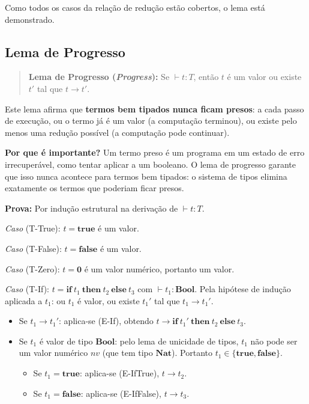 Como todos os casos da relação de redução estão cobertos, o lema está
demonstrado.

\subsection{Lema de Progresso}

\begin{quote}
  \textbf{Lema de Progresso (\emph{Progress}):} Se \(\vdash t : T\), então
  \(t\) é um valor ou existe \(t'\) tal que \(t \to t'\).
\end{quote}

Este lema afirma que \textbf{termos bem tipados nunca ficam presos}:
a cada passo de execução, ou o termo já é um valor (a computação
terminou), ou existe pelo menos uma redução possível (a computação
pode continuar).

\textbf{Por que é importante?} Um termo preso é um programa em um
estado de erro irrecuperável, como tentar aplicar
 a um booleano. O lema de progresso
garante que isso nunca acontece para termos bem tipados: o sistema de
tipos elimina exatamente os termos que poderiam ficar presos.

\textbf{Prova:} Por indução estrutural na derivação de \(\vdash t : T\).

\emph{Caso} (T-True): \(t = \mathbf{true}\) é um valor.

\emph{Caso} (T-False): \(t = \mathbf{false}\) é um valor.

\emph{Caso} (T-Zero): \(t = \mathbf{0}\) é um valor numérico, portanto um valor.

\emph{Caso} (T-If): \(t =
\mathbf{if}\ t_1\ \mathbf{then}\ t_2\ \mathbf{else}\ t_3\) com
\(\vdash t_1 : \mathbf{Bool}\). Pela hipótese de indução aplicada a
\(t_1\): ou \(t_1\) é valor, ou existe \(t_1'\) tal que \(t_1 \to t_1'\).

\begin{itemize}
  \item Se \(t_1 \to t_1'\): aplica-se (E-If), obtendo \(t \to
    \mathbf{if}\ t_1'\ \mathbf{then}\ t_2\ \mathbf{else}\ t_3\).
  \item Se \(t_1\) é valor de tipo \(\mathbf{Bool}\): pelo lema de
    unicidade de tipos, \(t_1\) não pode ser um valor numérico \(nv\)
    (que tem tipo \(\mathbf{Nat}\)). Portanto \(t_1 \in
    \{\mathbf{true}, \mathbf{false}\}\).

    \begin{itemize}
      \item Se \(t_1 = \mathbf{true}\): aplica-se (E-IfTrue), \(t \to t_2\).
      \item Se \(t_1 = \mathbf{false}\): aplica-se (E-IfFalse), \(t \to t_3\).
    \end{itemize}
\end{itemize}

